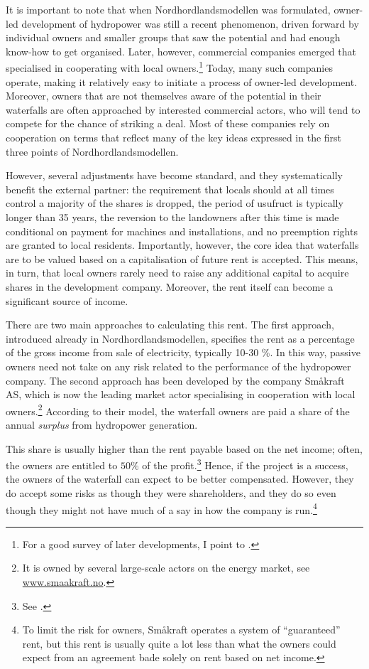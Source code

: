 It is important to note that when Nordhordlandsmodellen was formulated, owner-led development of hydropower was still a recent phenomenon, driven forward by individual owners and smaller groups that saw the potential and had enough know-how to get organised. Later, however, commercial companies emerged that specialised in cooperating with local owners.\footnote{For a good survey of later developments, I point to \cite{larsen06,larsen08,larsen12}.} Today, many such companies operate, making it relatively easy to initiate a process of owner-led development. Moreover, owners that are not themselves aware of the potential in their waterfalls are often approached by interested commercial actors, who will tend to compete for the chance of striking a deal. Most of these companies rely on cooperation on terms that reflect many of the key ideas expressed in the first three points of Nordhordlandsmodellen.

However, several adjustments have become standard, and they systematically benefit the external partner: the requirement that locals should at all times control a majority of the shares is dropped, the period of usufruct is typically longer than 35 years, the reversion to the landowners after this time is made conditional on payment for machines and installations, and no preemption rights are granted to local residents. Importantly, however, the core idea that waterfalls are to be valued based on a capitalisation of future rent is accepted. This means, in turn, that local owners rarely need to raise any additional capital to acquire shares in the development company. Moreover, the rent itself can become a significant source of income. 

There are two main approaches to calculating this rent. The first approach, introduced already in Nordhordlandsmodellen, specifies the rent as a percentage of the gross income from sale of electricity, typically 10-30 \%. In this way, passive owners need not take on any risk related to the performance of the hydropower company. The second approach has been developed by the company Småkraft AS, which is now the leading market actor specialising in cooperation with local owners.\footnote{It is owned by several large-scale actors on the energy market, see \url{www.smaakraft.no}.} According to their model, the waterfall owners are paid a share of the annual {\it surplus} from hydropower generation.

This share is usually higher than the rent payable based on the net income; often, the owners are entitled to $50 \%$ of the profit.\footnote{See \cite{aanesland09}.} Hence, if the project is a success, the owners of the waterfall can expect to be better compensated. However, they do accept some risks as though they were shareholders, and they do so even though they might not have much of a say in how the company is run.\footnote{To limit the risk for owners, Småkraft operates a system of ``guaranteed'' rent, but this rent is usually quite a lot less than what the owners could expect from an agreement bade solely on rent based on net income.}

